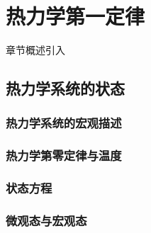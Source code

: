 \chapter{热力学第一定律}\label{10}

章节概述引入

\section{热力学系统的状态}\label{10-1}

\subsection{热力学系统的宏观描述}\label{10-1-1}

\subsection{热力学第零定律与温度}\label{10-1-2}

\subsection{状态方程}\label{10-1-3}

\subsection{微观态与宏观态}\label{10-1-4}